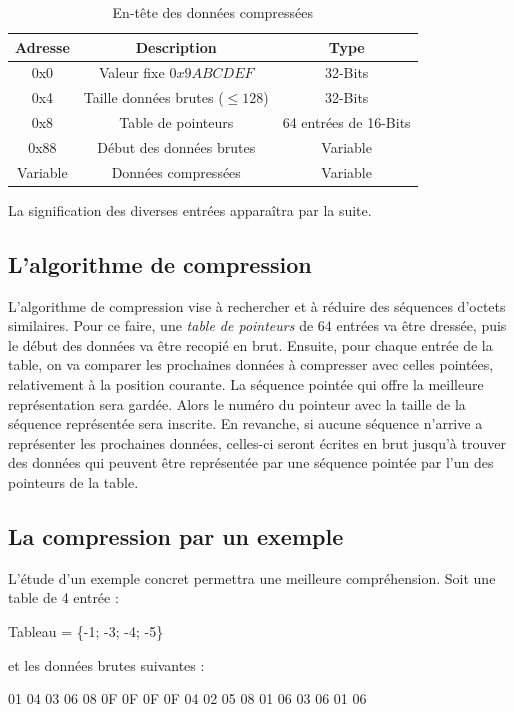 \begin{table}[!ht]
\centering
\begin{tabular}{| c | c | c |}
\hline
\textbf{Adresse} & \textbf{Description} & \textbf{Type} \\
\hline
\hline
0x0 & Valeur fixe $0x9ABCDEF$ & 32-Bits \\
0x4 & Taille données brutes ($ \leq 128$) & 32-Bits \\
0x8 & Table de pointeurs & 64 entrées de 16-Bits \\
0x88 & Début des données brutes & Variable \\
Variable & Données compressées & Variable \\
\hline
\end{tabular}
\caption{En-tête des données compressées}
\label{tab:entete_compression}
\end{table}

La signification des diverses entrées apparaîtra par la suite.

\subsection{L'algorithme de compression}
L'algorithme de compression vise à rechercher et à réduire des séquences
d'octets similaires. Pour ce faire, une \emph{table de pointeurs} de $64$
entrées va être dressée, puis le début des données va être recopié
en brut. Ensuite, pour chaque entrée de la table, on va comparer les
prochaines données à compresser avec celles pointées, relativement à la
position courante. La séquence pointée qui offre la meilleure
représentation sera gardée. Alors le numéro du pointeur avec la taille de
la séquence représentée sera inscrite. En revanche, si aucune séquence
n'arrive a représenter les prochaines données, celles-ci seront écrites
en brut jusqu'à trouver des données qui peuvent être représentée par une
séquence pointée par l'un des pointeurs de la table.

\subsection{La compression par un exemple}
L'étude d'un exemple concret permettra une meilleure compréhension. Soit une
table de 4 entrée :
\begin{exemple}
Tableau = \{-1; -3; -4; -5\}
\end{exemple}

et les données brutes suivantes :
\begin{exemple}
01 04 03 06 08 0F 0F 0F 0F 04 02 05 08 01 06 03 06 01 06
\end{exemple}

